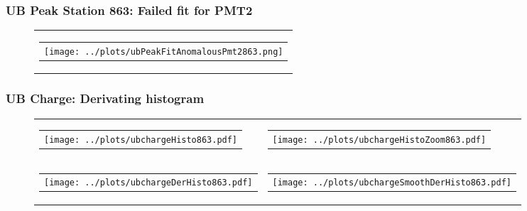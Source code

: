 \documentclass[aspectratio=169]{beamer}
\begin{document}
\begin{frame}
  \frametitle{UB Peak Station 863: Failed fit for PMT2}
  \begin{figure}
    \centering
    \begin{tabularx}{\textwidth}{C}
      \begin{tabular}{l}
        \texttt{[image: ../plots/ubPeakFitAnomalousPmt2863.png]}
      \end{tabular}
    \end{tabularx}
  \end{figure}

\end{frame}



\begin{frame}
  \frametitle{UB Charge: Derivating histogram} %
  \begin{figure}
    \centering
    \begin{tabularx}{\textwidth}{CC}
      \begin{tabular}{l}
        \texttt{[image: ../plots/ubchargeHisto863.pdf]}
      \end{tabular}
      &
      \begin{tabular}{l}
        \texttt{[image: ../plots/ubchargeHistoZoom863.pdf]}
      \end{tabular}
      \\
      \begin{tabular}{l}
        \texttt{[image: ../plots/ubchargeDerHisto863.pdf]}
      \end{tabular}
      &
      \begin{tabular}{l}
        \texttt{[image: ../plots/ubchargeSmoothDerHisto863.pdf]}
      \end{tabular}
    \end{tabularx}
  \end{figure}
\end{frame}
\end{document}
